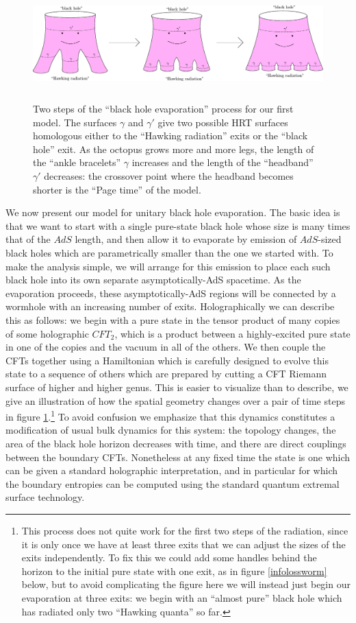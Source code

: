 \documentclass[12pt]{article}
\newcommand{\bfig}{\begin{figure}\begin{center}}
\newcommand{\efig}{\end{center}\end{figure}}
\theoremstyle{definition}
\begin{document}
\bfig
\includegraphics[height=4.3cm]{octopi2.pdf}
\caption{Two steps of the ``black hole evaporation'' process for our first model.  The surfaces $\gamma$ and $\gamma'$ give two possible HRT surfaces homologous either to the ``Hawking radiation'' exits or the ``black hole'' exit.  As the octopus grows more and more legs, the length of the ``ankle bracelets'' $\gamma$ increases and the length of the ``headband'' $\gamma'$ decreases: the crossover point where the headband becomes shorter is the ``Page time'' of the model.}\label{octopi} 
\efig
We now present our model for unitary black hole evaporation.  The basic idea is that we want to start with a single pure-state black hole whose size is many times that of the $AdS$ length, and then allow it to evaporate by emission of $AdS$-sized black holes which are parametrically smaller than the one we started with.  To make the analysis simple, we will arrange for this emission to place each such black hole into its own separate asymptotically-AdS spacetime.  As the evaporation proceeds, these asymptotically-AdS regions will be connected by a wormhole with an increasing number of exits.  Holographically we can describe this as follows: we begin with a pure state in the tensor product of many copies of some holographic $CFT_2$, which is a product between a highly-excited pure state in one of the copies and the vacuum in all of the others.  We then couple the CFTs together using a Hamiltonian which is carefully designed to evolve this state to a sequence of others which are prepared by cutting a CFT Riemann surface of higher and higher genus.  This is easier to visualize than to describe, we give an illustration of how the spatial geometry changes over a pair of time steps in figure \ref{octopi}.\footnote{This process does not quite work for the first two steps of the radiation, since it is only once we have at least three exits that we can adjust the sizes of the exits independently.  To fix this we could add some handles behind the horizon to the initial pure state with one exit, as in figure \ref{infolossworm} below, but to avoid complicating the figure here we will instead just begin our evaporation at three exits: we begin with an ``almost pure'' black hole which has radiated only two ``Hawking quanta'' so far.} To avoid confusion we emphasize that this dynamics constitutes a modification of usual bulk dynamics for this system: the topology changes, the area of the black hole horizon decreases with time, and there are direct couplings between the boundary CFTs.  Nonetheless at any fixed time the state is one which can be given a standard holographic interpretation, and in particular for which the boundary entropies can be computed using the standard quantum extremal surface technology.
\end{document}
